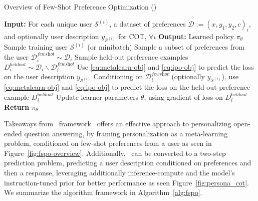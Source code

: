 \begin{center}
\begin{minipage}{\linewidth}
    \begin{algorithm}[H]
    \caption{Overview of Few-Shot Preference Optimization (\methodname)}
    \begin{algorithmic}[1]
    \State \textbf{Input:} For each unique user $\mathcal{S}^{(i)}$, a dataset of preferences $\mathcal{D}:={(x,y_1,y_2,c)}_{i}$, and optionally user description $y_{\mathcal{S}^{(i)}}$ for COT, $\forall i$
    \State \textbf{Output:} Learned policy $\pi_{\theta}$
    \State Sample training user $\mathcal{S}^{(i)}$ (or minibatch)
    \State Sample a subset of preferences from the user $\mathcal{D}_i^{\textit{fewshot}} \sim \mathcal{D}_i$
    \State Sample held-out preference examples $D_{i}^{\textit{heldout}} \sim \mathcal{D}_i \backslash \mathcal{D}_i^{\textit{fewshot}}$
    \State Use \cref{eq:metalearn-obj} and \cref{eq:ipo-obj} to predict the loss on the user description $y_{\mathcal{S}^{(i)}}$
    \EndIf
    \State Conditioning on $\mathcal{D}_i^{\textit{fewshot}}$ (optionally $y_{\mathcal{S}^{(i)}}$), use \cref{eq:metalearn-obj} and \cref{eq:ipo-obj} to predict the loss on the held-out preference example $D_{i}^{\textit{heldout}}$
    \State Update learner parameters $\theta$, using gradient of loss on $D_{i}^{\textit{heldout}}$
    \EndWhile
    \State \textbf{Return} $\pi_{\theta}$
    \end{algorithmic}
    \label{alg:fspo}
    \end{algorithm}
\end{minipage}
\end{center}

\begin{AIbox}{Takeaways from \methodname\ framework}
\methodname\ offers an effective approach to personalizing open-ended question answering, by framing personalization as a meta-learning problem, conditioned on few-shot preferences from a user as seen in Figure~\ref{fig:fspo-overview}. Additionally, \methodname\ can be converted to a two-step prediction problem, predicting a user description conditioned on preferences and then a response, leveraging additionally inference-compute and the model's instruction-tuned prior for better performance as seen Figure~\ref{fig:persona_cot}.  We summarize the algorithm framework in Algorithm~\ref{alg:fspo}.
\end{AIbox}
